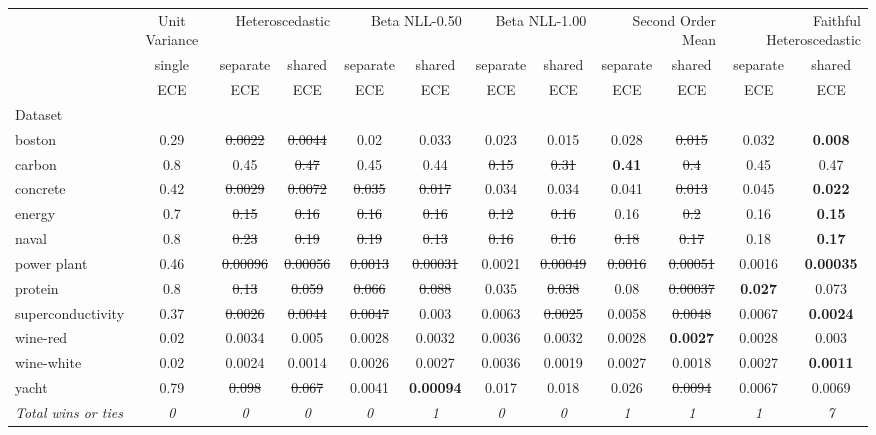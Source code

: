 \begin{tabular}{l|c|cc|cc|cc|cc|cc}
\toprule
{} & {Unit Variance} & \multicolumn{2}{r}{Heteroscedastic} & \multicolumn{2}{r}{Beta NLL-0.50} & \multicolumn{2}{r}{Beta NLL-1.00} & \multicolumn{2}{r}{Second Order Mean} & \multicolumn{2}{r}{Faithful Heteroscedastic} \\
{} & {single} & {separate} & {shared} & {separate} & {shared} & {separate} & {shared} & {separate} & {shared} & {separate} & {shared} \\
{} & {ECE} & {ECE} & {ECE} & {ECE} & {ECE} & {ECE} & {ECE} & {ECE} & {ECE} & {ECE} & {ECE} \\
{Dataset} & {} & {} & {} & {} & {} & {} & {} & {} & {} & {} & {} \\
\midrule
boston & 0.29 & \sout{0.0022} & \sout{0.0044} & 0.02 & 0.033 & 0.023 & 0.015 & 0.028 & \sout{0.015} & 0.032 & \textbf{0.008} \\
carbon & 0.8 & 0.45 & \sout{0.47} & 0.45 & 0.44 & \sout{0.15} & \sout{0.31} & \textbf{0.41} & \sout{0.4} & 0.45 & 0.47 \\
concrete & 0.42 & \sout{0.0029} & \sout{0.0072} & \sout{0.035} & \sout{0.017} & 0.034 & 0.034 & 0.041 & \sout{0.013} & 0.045 & \textbf{0.022} \\
energy & 0.7 & \sout{0.15} & \sout{0.16} & \sout{0.16} & \sout{0.16} & \sout{0.12} & \sout{0.16} & 0.16 & \sout{0.2} & 0.16 & \textbf{0.15} \\
naval & 0.8 & \sout{0.23} & \sout{0.19} & \sout{0.19} & \sout{0.13} & \sout{0.16} & \sout{0.16} & \sout{0.18} & \sout{0.17} & 0.18 & \textbf{0.17} \\
power plant & 0.46 & \sout{0.00096} & \sout{0.00056} & \sout{0.0013} & \sout{0.00031} & 0.0021 & \sout{0.00049} & \sout{0.0016} & \sout{0.00051} & 0.0016 & \textbf{0.00035} \\
protein & 0.8 & \sout{0.13} & \sout{0.059} & \sout{0.066} & \sout{0.088} & 0.035 & \sout{0.038} & 0.08 & \sout{0.00037} & \textbf{0.027} & 0.073 \\
superconductivity & 0.37 & \sout{0.0026} & \sout{0.0044} & \sout{0.0047} & 0.003 & 0.0063 & \sout{0.0025} & 0.0058 & \sout{0.0048} & 0.0067 & \textbf{0.0024} \\
wine-red & 0.02 & 0.0034 & 0.005 & 0.0028 & 0.0032 & 0.0036 & 0.0032 & 0.0028 & \textbf{0.0027} & 0.0028 & 0.003 \\
wine-white & 0.02 & 0.0024 & 0.0014 & 0.0026 & 0.0027 & 0.0036 & 0.0019 & 0.0027 & 0.0018 & 0.0027 & \textbf{0.0011} \\
yacht & 0.79 & \sout{0.098} & \sout{0.067} & 0.0041 & \textbf{0.00094} & 0.017 & 0.018 & 0.026 & \sout{0.0094} & 0.0067 & 0.0069 \\
\textit{{Total wins or ties}} & \textit{0} & \textit{0} & \textit{0} & \textit{0} & \textit{1} & \textit{0} & \textit{0} & \textit{1} & \textit{1} & \textit{1} & \textit{7} \\
\bottomrule
\end{tabular}
